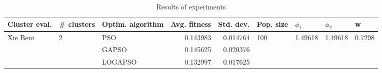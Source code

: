 \begin{table}
\centering
\caption{Results of experiments}
\begin{tabular}{lllrrllll}
\toprule
            Cluster eval. &        \# clusters & Optim. algorithm &  Avg. fitness &  Std. dev. &            Pop. size &               $\phi_{1}$ &               $\phi_{2}$ &                       w \\
\midrule
\multirow{3}{*}{Xie Beni} & \multirow{3}{*}{2} &              PSO &      0.143983 &   0.014764 & \multirow{3}{*}{100} & \multirow{3}{*}{1.49618} & \multirow{3}{*}{1.49618} & \multirow{3}{*}{0.7298} \\
                          &                    &            GAPSO &      0.145625 &   0.020376 &                      &                          &                          &                         \\
                          &                    &          LOGAPSO &      0.132997 &   0.017625 &                      &                          &                          &                         \\
\bottomrule
\end{tabular}
\end{table}
